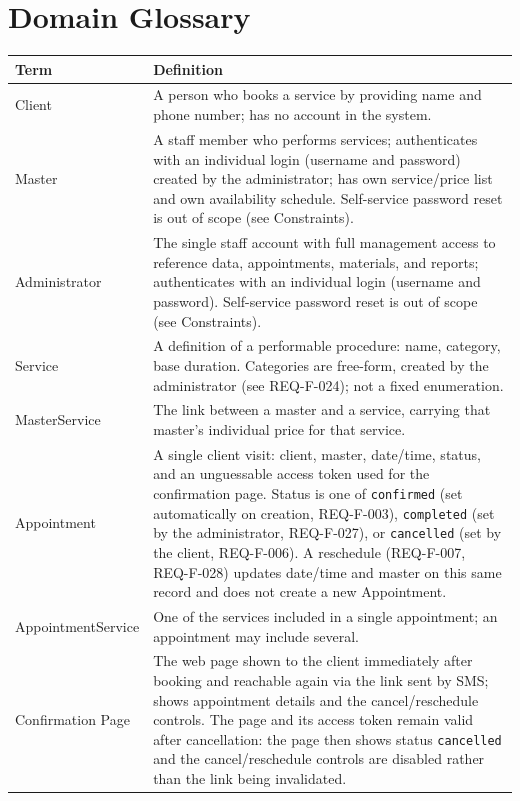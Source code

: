 \documentclass[11pt,a4paper]{article}
\begin{document}
\section{Domain Glossary}
\label{sec:glossary}

\begin{longtable}{L{3.4cm}L{10.6cm}}
\toprule
Term & Definition \\
\midrule
\endhead
Client & A person who books a service by providing name and phone number;
  has no account in the system. \\
Master & A staff member who performs services; authenticates with an
  individual login (username and password) created by the administrator;
  has own service/price list and own availability schedule. Self-service
  password reset is out of scope (see Constraints). \\
Administrator & The single staff account with full management access to
  reference data, appointments, materials, and reports; authenticates with
  an individual login (username and password). Self-service password reset
  is out of scope (see Constraints). \\
Service & A definition of a performable procedure: name, category, base
  duration. Categories are free-form, created by the administrator (see
  REQ-F-024); not a fixed enumeration. \\
MasterService & The link between a master and a service, carrying that
  master's individual price for that service. \\
Appointment & A single client visit: client, master, date/time, status,
  and an unguessable access token used for the confirmation page. Status is
  one of \texttt{confirmed} (set automatically on creation, REQ-F-003),
  \texttt{completed} (set by the administrator, REQ-F-027), or
  \texttt{cancelled} (set by the client, REQ-F-006). A reschedule
  (REQ-F-007, REQ-F-028) updates date/time and master on this same record
  and does not create a new Appointment. \\
AppointmentService & One of the services included in a single appointment;
  an appointment may include several. \\
Confirmation Page & The web page shown to the client immediately after
  booking and reachable again via the link sent by SMS; shows appointment
  details and the cancel/reschedule controls. The page and its access token
  remain valid after cancellation: the page then shows status
  \texttt{cancelled} and the cancel/reschedule controls are disabled
  rather than the link being invalidated. \\

\end{longtable}
\end{document}
